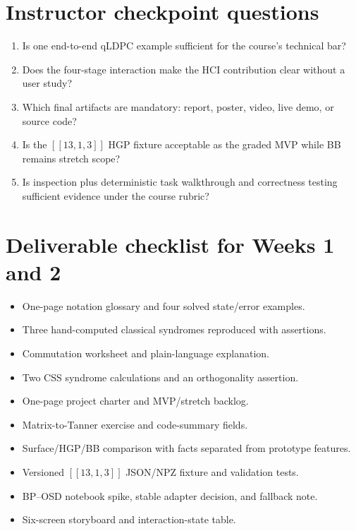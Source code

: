 \documentclass[11pt]{article}
\begin{document}
\appendix
\section{Instructor checkpoint questions}

\begin{enumerate}
  \item Is one end-to-end qLDPC example sufficient for the course's technical bar?
  \item Does the four-stage interaction make the HCI contribution clear without a user study?
  \item Which final artifacts are mandatory: report, poster, video, live demo, or source code?
  \item Is the \([[13,1,3]]\) HGP fixture acceptable as the graded MVP while BB remains stretch scope?
  \item Is inspection plus deterministic task walkthrough and correctness testing sufficient evidence
  under the course rubric?
\end{enumerate}

\section{Deliverable checklist for Weeks 1 and 2}

\begin{itemize}[label=\(\square\)]
  \item One-page notation glossary and four solved state/error examples.
  \item Three hand-computed classical syndromes reproduced with assertions.
  \item Commutation worksheet and plain-language explanation.
  \item Two CSS syndrome calculations and an orthogonality assertion.
  \item One-page project charter and MVP/stretch backlog.
  \item Matrix-to-Tanner exercise and code-summary fields.
  \item Surface/HGP/BB comparison with facts separated from prototype features.
  \item Versioned \([[13,1,3]]\) JSON/NPZ fixture and validation tests.
  \item BP--OSD notebook spike, stable adapter decision, and fallback note.
  \item Six-screen storyboard and interaction-state table.
\end{itemize}
\end{document}

